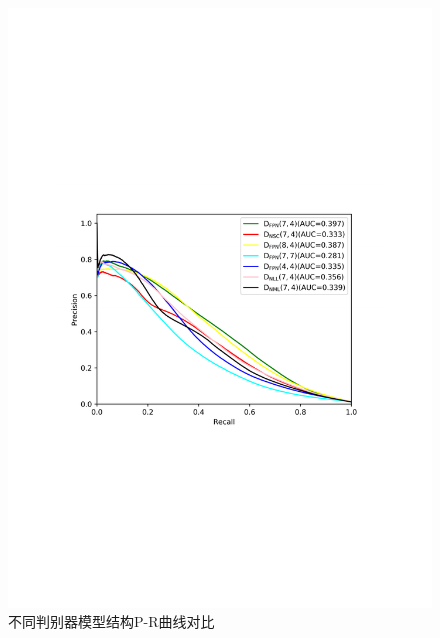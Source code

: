 \begin{figure}[h]
	\centering
	\includegraphics[width=1.0\textwidth]{figure/pr_curve_dis_arch/pr_curve.pdf}
	\caption{不同判别器模型结构P-R曲线对比} 
	\label{fig:pr_curve_skin_dis_arch}
\end{figure}

